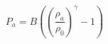 \documentclass[12pt]{article}
\begin{document}
$$
   P_a = B \left( \left(\frac{\rho_a}{\rho_0} \right)^{\gamma} - 1 \right)
$$
\end{document}
